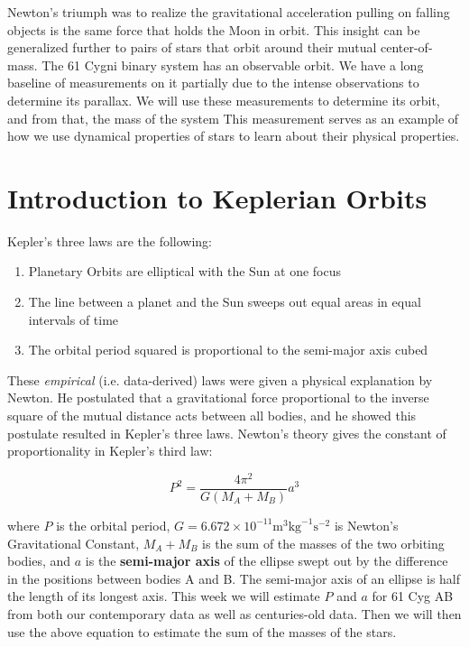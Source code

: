 Newton’s triumph was to realize the gravitational acceleration pulling on falling objects is the same force that holds the Moon in orbit.  This insight can be generalized further to pairs of stars that orbit around their mutual center-of-mass.  The 61 Cygni binary system has an observable orbit. We have a long baseline of measurements on it partially due to the intense observations to determine its parallax.  We will use these measurements to determine its orbit, and from that, the mass of the system  This measurement serves as an example of how we use dynamical properties of stars to learn about their physical properties. 
\section{Introduction to Keplerian Orbits}
 
Kepler's three laws are the following:

\begin{enumerate}
\item Planetary Orbits are elliptical with the Sun at one focus
\item The line between a planet and the Sun sweeps out equal areas in equal intervals of time
\item The orbital period squared is proportional to the semi-major axis cubed
\end{enumerate}

These \textit{empirical} (i.e. data-derived) laws were given a physical explanation by Newton. He postulated that a gravitational force proportional to the inverse square of the mutual distance acts between all bodies, and he showed this postulate resulted in Kepler’s three laws. Newton's theory gives the constant of proportionality in Kepler's third law:

\begin{equation}
P^2 = \frac{4\pi^2}{G(M_A + M_B)}a^3
\end{equation}

where $P$ is the orbital period, $G = 6.672 \times 10^{-11} \textrm{m}^3\textrm{kg}^{-1}\textrm{s}^{-2}$ is Newton's Gravitational Constant, $M_A + M_B$ is the sum of the masses of the two orbiting bodies, and $a$ is the \textbf{semi-major axis} of the ellipse swept out by the difference in the positions between bodies A and B. The semi-major axis of an ellipse is half the length of its longest axis. This week we will estimate $P$ and $a$ for 61 Cyg AB from both our contemporary data as well as centuries-old data. Then we will then use the above equation to estimate the sum of the masses of the stars. 

